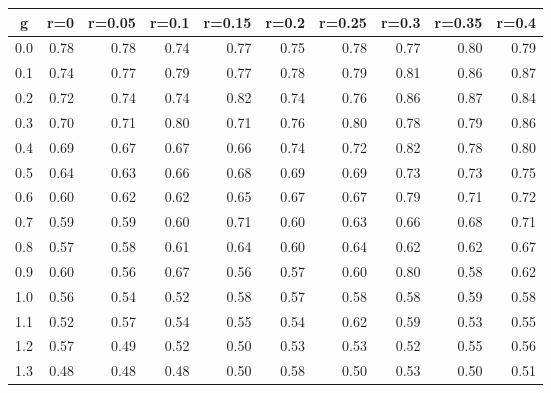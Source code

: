 %
\begin{table}[!tbp]
 \begin{center}
 \begin{tabular}{rrrrrrrrrr}\hline\hline
\multicolumn{1}{c}{g}&\multicolumn{1}{c}{r=0}&\multicolumn{1}{c}{r=0.05}&\multicolumn{1}{c}{r=0.1}&\multicolumn{1}{c}{r=0.15}&\multicolumn{1}{c}{r=0.2}&\multicolumn{1}{c}{r=0.25}&\multicolumn{1}{c}{r=0.3}&\multicolumn{1}{c}{r=0.35}&\multicolumn{1}{c}{r=0.4}\tabularnewline
\hline
0.0&0.78&0.78&0.74&0.77&0.75&0.78&0.77&0.80&0.79\tabularnewline
0.1&0.74&0.77&0.79&0.77&0.78&0.79&0.81&0.86&0.87\tabularnewline
0.2&0.72&0.74&0.74&0.82&0.74&0.76&0.86&0.87&0.84\tabularnewline
0.3&0.70&0.71&0.80&0.71&0.76&0.80&0.78&0.79&0.86\tabularnewline
0.4&0.69&0.67&0.67&0.66&0.74&0.72&0.82&0.78&0.80\tabularnewline
0.5&0.64&0.63&0.66&0.68&0.69&0.69&0.73&0.73&0.75\tabularnewline
0.6&0.60&0.62&0.62&0.65&0.67&0.67&0.79&0.71&0.72\tabularnewline
0.7&0.59&0.59&0.60&0.71&0.60&0.63&0.66&0.68&0.71\tabularnewline
0.8&0.57&0.58&0.61&0.64&0.60&0.64&0.62&0.62&0.67\tabularnewline
0.9&0.60&0.56&0.67&0.56&0.57&0.60&0.80&0.58&0.62\tabularnewline
1.0&0.56&0.54&0.52&0.58&0.57&0.58&0.58&0.59&0.58\tabularnewline
1.1&0.52&0.57&0.54&0.55&0.54&0.62&0.59&0.53&0.55\tabularnewline
1.2&0.57&0.49&0.52&0.50&0.53&0.53&0.52&0.55&0.56\tabularnewline
1.3&0.48&0.48&0.48&0.50&0.58&0.50&0.53&0.50&0.51\tabularnewline
\hline
\end{tabular}

\end{center}

\end{table}

